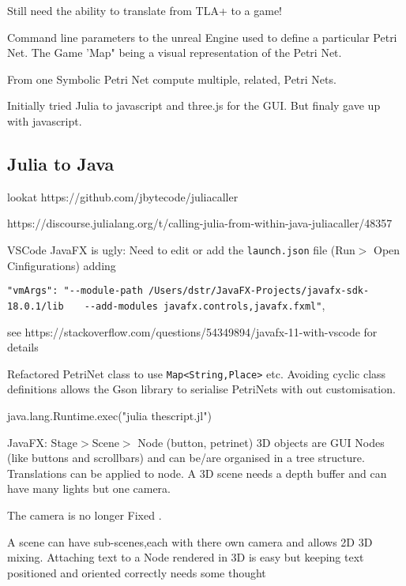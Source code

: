Still need the ability to translate from TLA+ to a game!

Command line parameters to the unreal Engine used to define a particular Petri Net. The Game 'Map" being a visual representation of the Petri Net.

From one Symbolic Petri Net compute multiple, related, Petri Nets. 



Initially tried Julia to javascript and three.js for the GUI.  But finaly gave up with javascript.

\subsection{Julia to Java}
lookat https://github.com/jbytecode/juliacaller

 https://discourse.julialang.org/t/calling-julia-from-within-java-juliacaller/48357

VSCode JavaFX is ugly: Need to edit or add the \verb|launch.json| file  (Run$>$ Open Cinfigurations) adding

\verb|"vmArgs": "--module-path /Users/dstr/JavaFX-Projects/javafx-sdk-18.0.1/lib |
    \hspace{1cm}     \verb|  --add-modules javafx.controls,javafx.fxml"|,
    
 see https://stackoverflow.com/questions/54349894/javafx-11-with-vscode for details

Refactored PetriNet class to use \verb|Map<String,Place>| etc. Avoiding cyclic class definitions allows the Gson library to serialise PetriNets with out customisation.

java.lang.Runtime.exec("julia thescript.jl")

JavaFX: Stage$>$Scene$>$ Node (button, petrinet)
   3D objects are GUI Nodes (like buttons and scrollbars) and can be/are  organised in a tree structure. Translations can be applied to node. A 3D scene needs a depth buffer and can have many lights but one camera. 
   
   The camera is no longer Fixed .
   
A scene can have sub-scenes,each with there own camera and allows 2D 3D mixing.
Attaching text to a Node rendered in 3D is easy but keeping text positioned and oriented correctly needs some thought

